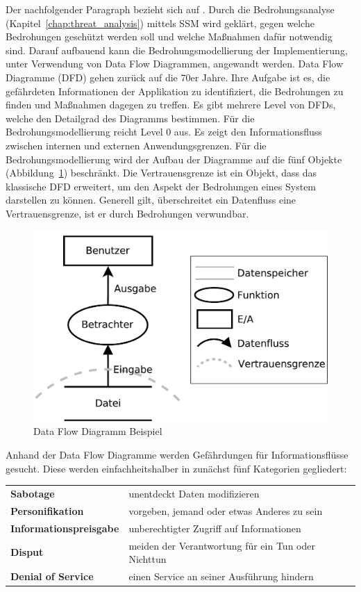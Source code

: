 \documentclass[11pt,a4paper]{report}
\begin{document}
Der nachfolgender Paragraph bezieht sich auf \cite[s.~263]{gutmann}.
Durch die Bedrohungsanalyse (Kapitel~\ref{chap:threat_analysis}) mittels SSM wird geklärt, gegen welche Bedrohungen geschützt werden soll und welche Maßnahmen dafür notwendig sind. Darauf aufbauend kann die Bedrohungsmodellierung der Implementierung, unter Verwendung von Data Flow Diagrammen, angewandt werden. Data Flow Diagramme (DFD) gehen zurück auf die 70er Jahre. Ihre Aufgabe ist es, die gefährdeten Informationen der Applikation zu identifiziert, die Bedrohungen zu finden und Maßnahmen dagegen zu treffen. Es gibt mehrere Level von DFDs, welche den Detailgrad des Diagramms bestimmen. Für die Bedrohungsmodellierung reicht Level 0 aus. Es zeigt den Informationsfluss zwischen internen und externen Anwendungsgrenzen. Für die Bedrohungsmodellierung wird der Aufbau der Diagramme auf die fünf Objekte (Abbildung~\ref{fig:dfd_intro}) beschränkt. Die Vertrauensgrenze ist ein Objekt, dass das klassische DFD erweitert, um den Aspekt der Bedrohungen eines System darstellen zu können. Generell gilt, überschreitet ein Datenfluss eine Vertrauensgrenze, ist er durch Bedrohungen verwundbar.

\begin{figure}[htbp]
\centering
\includegraphics[scale=0.4]{images/dfd_intro.pdf}
\caption{Data Flow Diagramm Beispiel}
\label{fig:dfd_intro}
\end{figure}

Anhand der Data Flow Diagramme werden Gefährdungen für Informationsflüsse gesucht. Diese werden einfachheitshalber in zunächst fünf Kategorien gegliedert:

\begin{table}[h] %
\begin{tabularx}{\linewidth}{@{}lX@{}}
\textbf{Sabotage} & unentdeckt Daten modifizieren\\
\textbf{Personifikation} & vorgeben, jemand oder etwas Anderes zu sein\\
\textbf{Informationspreisgabe} & unberechtigter Zugriff auf Informationen\\
\textbf{Disput} & meiden der Verantwortung für ein Tun oder Nichttun\\
\textbf{Denial of Service} & einen Service an seiner Ausführung hindern\\
\end{tabularx}
\end{table}
\end{document}
